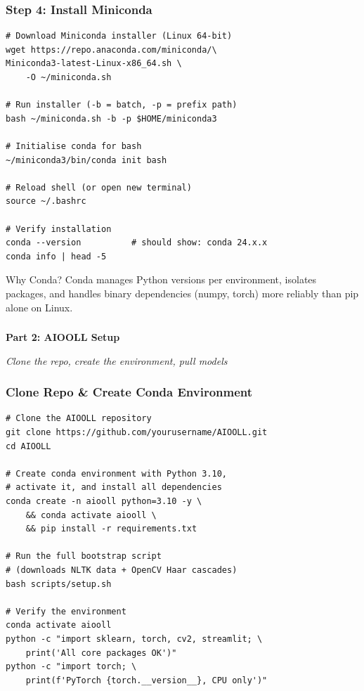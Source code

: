 \begin{frame}[fragile]\frametitle{Step 4: Install Miniconda}
\begin{lstlisting}
# Download Miniconda installer (Linux 64-bit)
wget https://repo.anaconda.com/miniconda/\
Miniconda3-latest-Linux-x86_64.sh \
    -O ~/miniconda.sh

# Run installer (-b = batch, -p = prefix path)
bash ~/miniconda.sh -b -p $HOME/miniconda3

# Initialise conda for bash
~/miniconda3/bin/conda init bash

# Reload shell (or open new terminal)
source ~/.bashrc

# Verify installation
conda --version          # should show: conda 24.x.x
conda info | head -5
\end{lstlisting}
\begin{block}{Why Conda?}
Conda manages Python versions per environment, isolates packages, and handles binary dependencies (numpy, torch) more reliably than pip alone on Linux.
\end{block}
\end{frame}

\begin{frame}[fragile]\frametitle{}
\begin{center}
{\Large \textbf{Part 2: AIOOLL Setup}}\

\textit{Clone the repo, create the environment, pull models}
\end{center}
\end{frame}

\begin{frame}[fragile]\frametitle{Clone Repo \& Create Conda Environment}
\begin{lstlisting}
# Clone the AIOOLL repository
git clone https://github.com/yourusername/AIOOLL.git
cd AIOOLL

# Create conda environment with Python 3.10,
# activate it, and install all dependencies
conda create -n aiooll python=3.10 -y \
    && conda activate aiooll \
    && pip install -r requirements.txt

# Run the full bootstrap script
# (downloads NLTK data + OpenCV Haar cascades)
bash scripts/setup.sh

# Verify the environment
conda activate aiooll
python -c "import sklearn, torch, cv2, streamlit; \
    print('All core packages OK')"
python -c "import torch; \
    print(f'PyTorch {torch.__version__}, CPU only')"
\end{lstlisting}
\end{frame}

